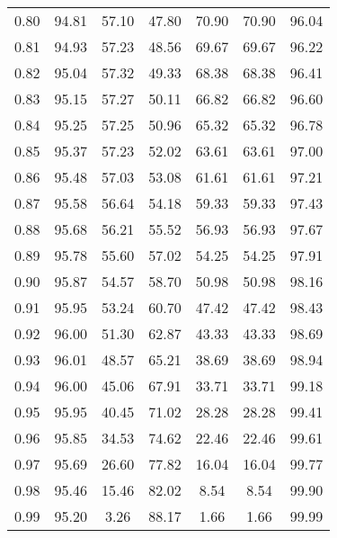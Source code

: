 \begin{tabular}{|c|c|c|c|c|c|c|}
      0.80 &     94.81 &     57.10 &      47.80 &   70.90 &      70.90 &         96.04 \\
      0.81 &     94.93 &     57.23 &      48.56 &   69.67 &      69.67 &         96.22 \\
      0.82 &     95.04 &     57.32 &      49.33 &   68.38 &      68.38 &         96.41 \\
      0.83 &     95.15 &     57.27 &      50.11 &   66.82 &      66.82 &         96.60 \\
      0.84 &     95.25 &     57.25 &      50.96 &   65.32 &      65.32 &         96.78 \\
      0.85 &     95.37 &     57.23 &      52.02 &   63.61 &      63.61 &         97.00 \\
      0.86 &     95.48 &     57.03 &      53.08 &   61.61 &      61.61 &         97.21 \\
      0.87 &     95.58 &     56.64 &      54.18 &   59.33 &      59.33 &         97.43 \\
      0.88 &     95.68 &     56.21 &      55.52 &   56.93 &      56.93 &         97.67 \\
      0.89 &     95.78 &     55.60 &      57.02 &   54.25 &      54.25 &         97.91 \\
      0.90 &     95.87 &     54.57 &      58.70 &   50.98 &      50.98 &         98.16 \\
      0.91 &     95.95 &     53.24 &      60.70 &   47.42 &      47.42 &         98.43 \\
      0.92 &     96.00 &     51.30 &      62.87 &   43.33 &      43.33 &         98.69 \\
      0.93 &     96.01 &     48.57 &      65.21 &   38.69 &      38.69 &         98.94 \\
      0.94 &     96.00 &     45.06 &      67.91 &   33.71 &      33.71 &         99.18 \\
      0.95 &     95.95 &     40.45 &      71.02 &   28.28 &      28.28 &         99.41 \\
      0.96 &     95.85 &     34.53 &      74.62 &   22.46 &      22.46 &         99.61 \\
      0.97 &     95.69 &     26.60 &      77.82 &   16.04 &      16.04 &         99.77 \\
      0.98 &     95.46 &     15.46 &      82.02 &    8.54 &       8.54 &         99.90 \\
      0.99 &     95.20 &      3.26 &      88.17 &    1.66 &       1.66 &         99.99 \\
\bottomrule
\end{tabular}
